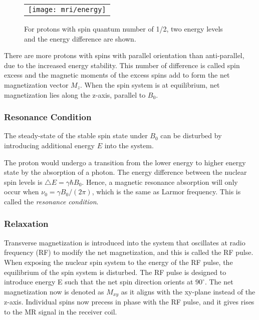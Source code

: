 \begin{figure}[h]
\begin{center}
\begin{tabular}{c}
\texttt{[image: mri/energy]}
\end{tabular}
\caption{For protons with spin quantum number of 1/2, two energy
levels and the energy difference are shown.} \label{fig:energy}
\end{center}
\end{figure}

There are more protons with spins with parallel orientation than anti-parallel, due to the increased energy stability. This number of difference is called spin excess and the magnetic moments of the excess spins add to form the net magnetization vector $M_z$. When the spin system is at equilibrium, net magnetization lies along the z-axis, parallel to $B_0$.

\subsubsection{Resonance Condition}

The steady-state of the stable spin state under $B_0 $ can be disturbed by introducing additional energy $E$ into the system. 

The proton would undergo a transition from the lower energy to higher energy state by the absorption of a photon. The energy difference between the nuclear spin levels is $\bigtriangleup E = \gamma \hbar B_0$. Hence, a magnetic resonance absorption will only occur when $\nu_0 = \gamma B_0/(2 \pi)$, which is the same as Larmor frequency. This is called the \textit{resonance condition}. 

\subsubsection{Relaxation}
Transverse magnetization is introduced into the system that oscillates at radio frequency (RF) to modify the net magnetization, and this is called the RF pulse. When exposing the nuclear spin system to the energy of the RF pulse, the equilibrium of the spin system is disturbed. The RF pulse is designed to introduce energy E such that the net spin direction orients at $90^\circ$. The net magnetization now is denoted as $M_{xy}$ as it aligns with the xy-plane instead of the z-axis. Individual spins now precess in phase with the RF pulse, and it gives rises to the MR signal in the receiver coil. 

